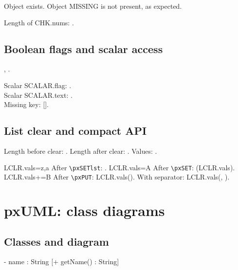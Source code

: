 \documentclass[fake,default]{P3CTeX}
\begin{document}
	{Object exists.}
	{Object MISSING is not present, as expected.}

Length of CHK.nums: .

\subsection{Boolean flags and scalar access}
,\quad
{}.

Scalar SCALAR.flag: .\\
Scalar SCALAR.text: .\\
Missing key: [].

\subsection{List clear and compact API}
Length before clear: .
Length after clear: .
Values: .

\pxSETlst LCLR.vals={z,a}
After \verb|\pxSETlst|: .
\pxSET LCLR.vals=A
After \verb|\pxSET|: \pxGETtl(LCLR.vals).
\pxPUT LCLR.vals+=B
After \verb|\pxPUT|: \pxPRINTlst LCLR.vals().
With separator: \pxPRINTlst LCLR.vals(, ).

\section{pxUML: class diagrams}

\subsection{Classes and diagram}
	{- name : String}
	[+ getName() : String]

\end{document}
